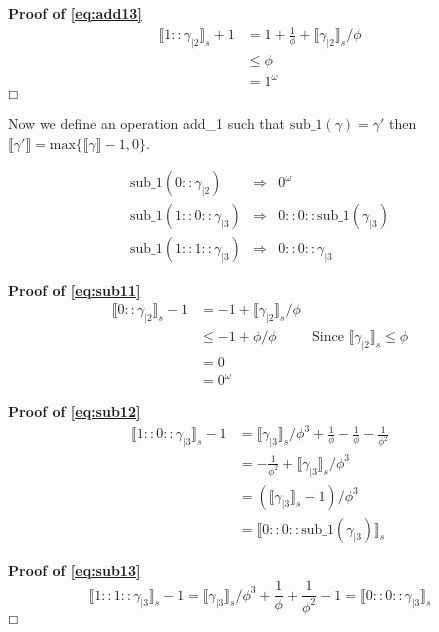 \documentclass{cs4rep}
\begin{document}
{\bf Proof of \ref{eq:add13}}
\[ \begin{array}{ll}
\llbracket 1::\gamma_{|2} \rrbracket_{s} + 1 & = 1 + \frac{1}{\phi} + \llbracket \gamma_{|2} \rrbracket_{s}/\phi \\
& \leq \phi \\
& = 1^{\omega}
\end{array} \]
\hfill $\boxempty$

Now we define an operation add\_1 such that $\mbox{sub\_1}(\gamma)=\gamma'$ then $\llbracket \gamma' \rrbracket = \mbox{max}\{ \llbracket \gamma \rrbracket - 1, 0 \}$.

\begin{eqnarray}
\mbox{sub\_1}(0::\gamma_{|2}) & \Rightarrow & 0^{\omega} \label{eq:sub11} \\
\mbox{sub\_1}(1::0::\gamma_{|3}) & \Rightarrow & 0::0::\mbox{sub\_1}(\gamma_{|3}) \label{eq:sub12} \\
\mbox{sub\_1}(1::1::\gamma_{|3}) & \Rightarrow & 0::0::\gamma_{|3} \label{eq:sub13}
\end{eqnarray}

{\bf Proof of \ref{eq:sub11}}
\[ \begin{array}{lll}
\llbracket 0::\gamma_{|2} \rrbracket_{s} - 1 & = -1 + \llbracket \gamma_{|2} \rrbracket_{s}/\phi \\
& \leq  -1 + \phi/\phi & \mbox{Since } \llbracket \gamma_{|2} \rrbracket_{s} \leq \phi \\
& = 0 \\
& = 0^{\omega}
\end{array} \]

{\bf Proof of \ref{eq:sub12}}
\[ \begin{array}{ll}
\llbracket 1::0::\gamma_{|3} \rrbracket_{s} - 1 & = \llbracket \gamma_{|3} \rrbracket_{s}/\phi^{3} + \frac{1}{\phi} - \frac{1}{\phi} - \frac{1}{\phi^{2}}\\
& = - \frac{1}{\phi^{2}} + \llbracket \gamma_{|3} \rrbracket_{s}/\phi^{3} \\
& = (\llbracket \gamma_{|3} \rrbracket_{s} - 1)/\phi^{3} \\
& = \llbracket 0::0::\mbox{sub\_1}(\gamma_{|3}) \rrbracket_{s}
\end{array} \]

{\bf Proof of \ref{eq:sub13}}
\[ \llbracket 1::1::\gamma_{|3} \rrbracket_{s} - 1 = \llbracket \gamma_{|3} \rrbracket_{s}/\phi^{3} + \frac{1}{\phi} + \frac{1}{\phi^{2}} - 1 = \llbracket 0::0::\gamma_{|3} \rrbracket_{s} \]
\hfill $\boxempty$
\end{document}
